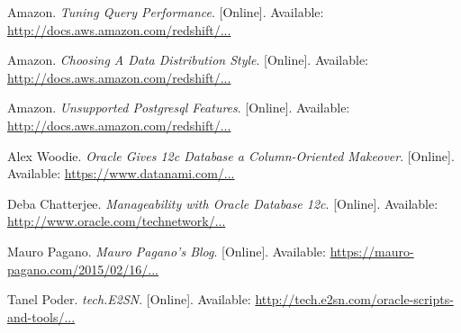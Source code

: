 \documentclass[draftclsnofoot, onecolumn, compsoc, 10pt]{IEEEtran}
\begin{document}
\begin{thebibliography}{9}
Amazon.
\textit{Tuning Query Performance}.
[Online].
Available: \href{http://docs.aws.amazon.com/redshift/latest/dg/c-optimizing-query-performance.html}{http://docs.aws.amazon.com/redshift/...}

Amazon.
\textit{Choosing A Data Distribution Style}.
[Online].
Available: \href{http://docs.aws.amazon.com/redshift/latest/dg/t_Distributing_data.html}{http://docs.aws.amazon.com/redshift/...}

Amazon.
\textit{Unsupported Postgresql Features}.
[Online].
Available: \href{http://docs.aws.amazon.com/redshift/latest/dg/c_unsupported-postgresql-features.html}{http://docs.aws.amazon.com/redshift/...}

Alex Woodie.
\textit{Oracle Gives 12c Database a Column-Oriented Makeover}.
[Online].
Available: \href{https://www.datanami.com/2013/09/23/oracle_gives_12c_database_a_column-oriented_makeover/}{https://www.datanami.com/...}


Deba Chatterjee.
\textit{Manageability with Oracle Database 12c}.
[Online].
Available: \href{http://www.oracle.com/technetwork/database/manageability/database-manageability-wp-12c-1964677.pdf}{http://www.oracle.com/technetwork/...}

Mauro Pagano.
\textit{Mauro Pagano's Blog}.
[Online].
Available: \href{https://mauro-pagano.com/2015/02/16/sqld360-sql-diagnostics-collection-made-faster/}{https://mauro-pagano.com/2015/02/16/...}

Tanel Poder.
\textit{tech.E2SN}.
[Online].
Available: \href{http://tech.e2sn.com/oracle-scripts-and-tools/session-snapper}{http://tech.e2sn.com/oracle-scripts-and-tools/...}

\end{thebibliography}
\end{document}

